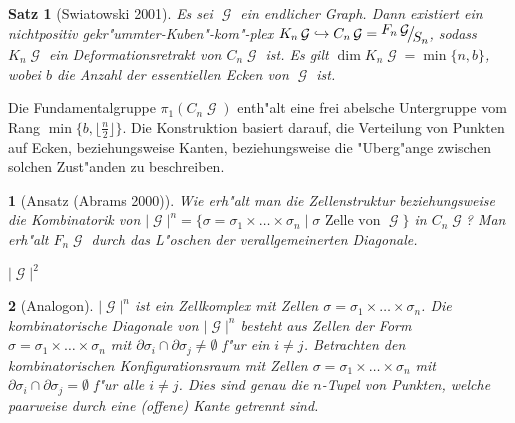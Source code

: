 \documentclass[paper=A4, twoside, chapterprefix=true, bibliography=totoc, headsepline]{scrbook}
\newcommand{\tikzgitter}[3][0.25]{ %
	\draw[step=#1,gray!15] #2 grid #3;
	\draw[step=2*#1,gray!30] #2 grid #3;
	\fill (0,0) circle(0.1); 
}
\DeclareMathOperator{\calG}{\mathcal{G}}
\newcommand{\G}{\calG}
\newcommand{\X}{\times}
\newcommand{\FakRaum}[2]{
	\raisebox{0.7ex}{\ensuremath{#1}}
	\ensuremath{\mkern-3mu}\big/\ensuremath{\mkern-3mu}
	\raisebox{-0.6ex}{\ensuremath{#2}}}
\theoremstyle{break}
\theoremstyle{nonumberbreak}
\newtheorem{satz}{Satz}
\theoremstyle{emptybreak}
\newtheorem{emptythm}{}%
\theoremstyle{break}
\newcommand{\quot}[1]{\textrm{\glqq}{#1}\textrm{\grqq}}
\begin{document}
\begin{satz}[Swiatowski 2001]
Es sei $\G$ ein endlicher Graph.
Dann existiert ein nichtpositiv gekr"ummter-Kuben"-kom"-plex $K_n\G \hookrightarrow C_n\G = \FakRaum{F_n\calG}{S_n}$, sodass $K_n\calG$ ein Deformationsretrakt von $C_n\G$ ist.
Es gilt $\dim K_n\calG = \min \{n, b\}$, wobei $b$ die Anzahl der essentiellen Ecken von $\G$ ist.
\end{satz}


Die Fundamentalgruppe $\pi_1(C_n\G)$ enth"alt eine frei abelsche Untergruppe vom Rang $\min\{b, \lfloor \frac{n}{2} \rfloor\}$.
Die Konstruktion basiert darauf, die Verteilung von Punkten auf Ecken, beziehungsweise Kanten, beziehungsweise die "Uberg"ange zwischen solchen Zust"anden zu beschreiben.

\begin{emptythm}[Ansatz (Abrams 2000)]
Wie erh"alt man die Zellenstruktur beziehungsweise die Kombinatorik von $|\G|^n = \{ \sigma = \sigma_1 \X \ldots \X \sigma_n \mid \sigma \text{ Zelle von } \G \}$ in $C_n\G$?
Man erh"alt $F_n\G$ durch das \quot{L"oschen} der verallgemeinerten Diagonale.
\begin{center} $|\G|^2$\end{center}
\end{emptythm}

\begin{emptythm}[Analogon]
$|\G|^n$ ist ein Zellkomplex mit Zellen $\sigma = \sigma_1 \X \ldots \X \sigma_n$.
Die kombinatorische Diagonale von $|\G|^n$ besteht aus Zellen der Form $\sigma = \sigma_1 \X \ldots \X \sigma_n$ mit $\partial\sigma_i \cap \partial\sigma_j \ne \emptyset$ f"ur ein $i \ne j$.
Betrachten den kombinatorischen Konfigurationsraum mit Zellen $\sigma = \sigma_1 \X \ldots \X \sigma_n$ mit $\partial\sigma_i \cap \partial\sigma_j = \emptyset$ f"ur alle $i \ne j$.
Dies sind genau die $n$-Tupel von Punkten, welche paarweise durch eine (offene) Kante getrennt sind.
\end{emptythm}
\end{document}
